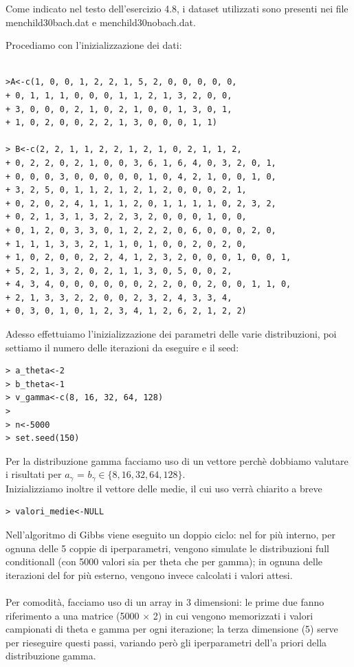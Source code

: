 \begin{enumerate}
Come indicato nel testo dell'esercizio 4.8, i dataset utilizzati sono presenti nei file menchild30bach.dat
e menchild30nobach.dat.

Procediamo con l'inizializzazione dei dati:
\begin{verbatim}

>A<-c(1, 0, 0, 1, 2, 2, 1, 5, 2, 0, 0, 0, 0, 0,
+ 0, 1, 1, 1, 0, 0, 0, 1, 1, 2, 1, 3, 2, 0, 0,
+ 3, 0, 0, 0, 2, 1, 0, 2, 1, 0, 0, 1, 3, 0, 1,
+ 1, 0, 2, 0, 0, 2, 2, 1, 3, 0, 0, 0, 1, 1)

> B<-c(2, 2, 1, 1, 2, 2, 1, 2, 1, 0, 2, 1, 1, 2,
+ 0, 2, 2, 0, 2, 1, 0, 0, 3, 6, 1, 6, 4, 0, 3, 2, 0, 1,
+ 0, 0, 0, 3, 0, 0, 0, 0, 0, 1, 0, 4, 2, 1, 0, 0, 1, 0,
+ 3, 2, 5, 0, 1, 1, 2, 1, 2, 1, 2, 0, 0, 0, 2, 1,
+ 0, 2, 0, 2, 4, 1, 1, 1, 2, 0, 1, 1, 1, 1, 0, 2, 3, 2,
+ 0, 2, 1, 3, 1, 3, 2, 2, 3, 2, 0, 0, 0, 1, 0, 0,
+ 0, 1, 2, 0, 3, 3, 0, 1, 2, 2, 2, 0, 6, 0, 0, 0, 2, 0,
+ 1, 1, 1, 3, 3, 2, 1, 1, 0, 1, 0, 0, 2, 0, 2, 0,
+ 1, 0, 2, 0, 0, 2, 2, 4, 1, 2, 3, 2, 0, 0, 0, 1, 0, 0, 1,
+ 5, 2, 1, 3, 2, 0, 2, 1, 1, 3, 0, 5, 0, 0, 2,
+ 4, 3, 4, 0, 0, 0, 0, 0, 0, 2, 2, 0, 0, 2, 0, 0, 1, 1, 0,
+ 2, 1, 3, 3, 2, 2, 0, 0, 2, 3, 2, 4, 3, 3, 4,
+ 0, 3, 0, 1, 0, 1, 2, 3, 4, 1, 2, 6, 2, 1, 2, 2)

\end{verbatim}

Adesso effettuiamo l'inizializzazione dei parametri delle varie distribuzioni, poi settiamo il numero delle iterazioni da eseguire e il seed:

\begin{verbatim}
> a_theta<-2
> b_theta<-1
> v_gamma<-c(8, 16, 32, 64, 128)
> 
> n<-5000
> set.seed(150)
\end{verbatim}

Per la distribuzione gamma facciamo uso di un vettore perchè dobbiamo valutare i risultati per $a_\gamma$ = $b_\gamma \in \lbrace 8, 16, 32, 64, 128 \rbrace $.\\
Inizializziamo inoltre il vettore delle medie, il cui uso verrà chiarito a breve
\begin{verbatim}
> valori_medie<-NULL
\end{verbatim}

Nell'algoritmo di Gibbs viene eseguito un doppio ciclo: nel for più interno, per ognuna delle 5 coppie di iperparametri, vengono simulate le distribuzioni full conditionall (con 5000 valori sia per theta che per gamma); in ognuna delle iterazioni del for più esterno, vengono invece calcolati i valori attesi. \\ \\
Per comodità, facciamo uso di un array in 3 dimensioni: le prime due fanno riferimento a una matrice (5000 $\times$ 2) in cui vengono memorizzati i valori campionati di theta e gamma per ogni iterazione; la terza dimensione (5) serve per rieseguire questi passi, variando però gli iperparametri dell'a priori della distribuzione gamma.


\end{enumerate}
